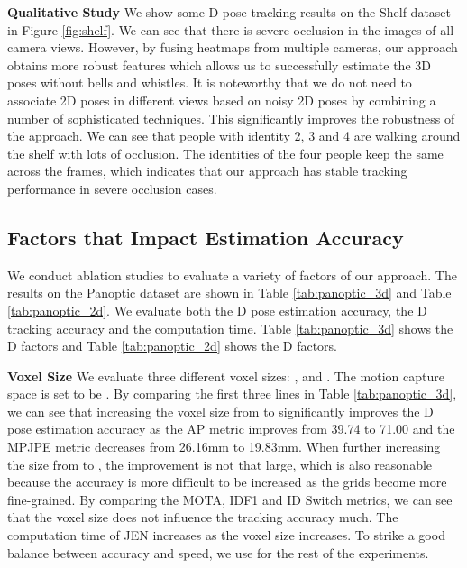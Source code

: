 \vspace{1em}
\noindent
\textbf{Qualitative Study } We show some D pose tracking results on the Shelf dataset in Figure \ref{fig:shelf}. We can see that there is severe occlusion in the images of all camera views. However, by fusing heatmaps from multiple cameras, our approach obtains more robust features which allows us to successfully estimate the 3D poses without bells and whistles. It is noteworthy that we do not need to associate 2D poses in different views based on noisy 2D poses by combining a number of sophisticated techniques. This significantly improves the robustness of the approach. We can see that people with identity 2, 3 and 4 are walking around the shelf with lots of occlusion. The identities of the four people keep the same across the frames, which indicates that our approach has stable tracking performance in severe occlusion cases. 

\subsection{Factors that Impact Estimation Accuracy}
We conduct ablation studies to evaluate a variety of factors of our approach. The results on the Panoptic dataset \cite{Joo_2017_TPAMI} are shown in Table \ref{tab:panoptic_3d} and Table \ref{tab:panoptic_2d}. We evaluate both the D pose estimation accuracy, the D tracking accuracy and the computation time. Table \ref{tab:panoptic_3d} shows the D factors and Table \ref{tab:panoptic_2d} shows the D factors.

\vspace{0.5em}
\noindent
\textbf{Voxel Size }
We evaluate three different voxel sizes: ,  and . The motion capture space is set to be . By comparing the first three lines in Table \ref{tab:panoptic_3d}, we can see that increasing the voxel size from  to  significantly improves the D pose estimation accuracy as the AP metric improves from 39.74 to 71.00 and the MPJPE metric decreases from 26.16mm to 19.83mm. When further increasing the size from  to , the improvement is not that large, which is also reasonable because the accuracy is more difficult to be increased as the grids become more fine-grained. By comparing the MOTA, IDF1 and ID Switch metrics, we can see that the voxel size does not influence the tracking accuracy much. The computation time of JEN increases as the voxel size increases. To strike a good balance between accuracy and speed, we use  for the rest of the experiments. 


